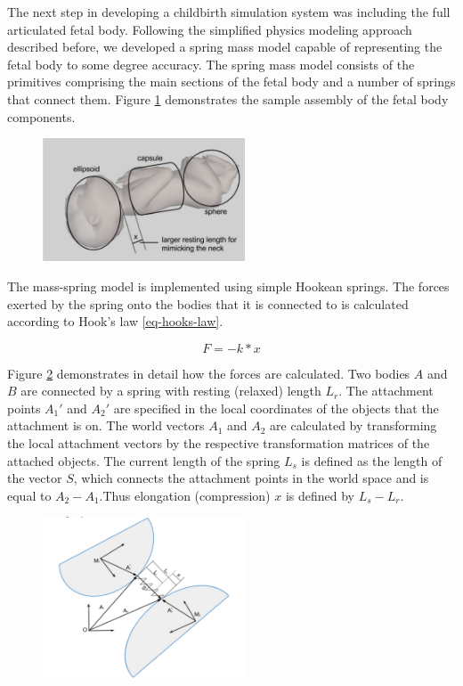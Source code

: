 The next step in developing a childbirth simulation system was including the full articulated fetal body.
Following the simplified physics modeling approach described before, we developed a spring mass model capable of representing the fetal body to some degree accuracy. The spring mass model consists of the primitives comprising the main sections of the fetal body and a number of springs that connect them. Figure \ref{full-articulated} demonstrates the sample assembly of the fetal body components.

\begin{figure}
  \centering
    \includegraphics[width=60mm]{sections/methodology/images/basic/full-articulated.png}
  \caption[The simplified articulated mass-spring fetal body model]{\label{full-articulated}}
\end{figure}

The mass-spring model is implemented using simple Hookean springs. The forces exerted by the spring onto the bodies that it is connected to is calculated according to Hook's law \ref{eq-hooks-law}.


\begin{equation}
\label{eq-hooks-law}
F = - k * x
\end{equation}

Figure \ref{mass-spring-detail} demonstrates in detail how the forces are calculated. Two bodies $A$ and $B$ are connected by a spring with resting (relaxed) length $L_r$. The attachment points $A_1'$ and $A_2'$ are specified in the local coordinates of the objects that the attachment is on. The world vectors $A_1$ and $A_2$ are calculated by transforming the local attachment vectors by the respective transformation matrices of the attached objects. The current length of the spring $L_s$ is defined as the length of the vector $S$, which connects the attachment points in the world space and is equal to $A_2-A_1$.Thus elongation (compression) $x$ is defined by $L_s-L_r$.

\begin{figure}
  \centering
    \includegraphics[width=60mm]{sections/methodology/images/basic/mass-spring-detail.png}
  \caption[The detailed representation of a single spring attachment in the full body fetal mass-spring model. ]{\label{mass-spring-detail}}
\end{figure}

